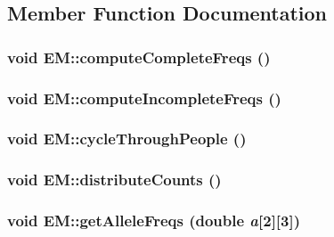 \subsection{Member Function Documentation}
\hypertarget{classEM_a385df83b9c344ceaa000966dccc92796}{
\subsubsection[{computeCompleteFreqs}]{\setlength{\rightskip}{0pt plus 5cm}void EM::computeCompleteFreqs ()}}
\label{classEM_a385df83b9c344ceaa000966dccc92796}
\hypertarget{classEM_af7ab6d102b2901761764b91abb28d88a}{
\subsubsection[{computeIncompleteFreqs}]{\setlength{\rightskip}{0pt plus 5cm}void EM::computeIncompleteFreqs ()}}
\label{classEM_af7ab6d102b2901761764b91abb28d88a}
\hypertarget{classEM_a65fd72ccd0f1a9ff5289e96d419fa65f}{
\subsubsection[{cycleThroughPeople}]{\setlength{\rightskip}{0pt plus 5cm}void EM::cycleThroughPeople ()}}
\label{classEM_a65fd72ccd0f1a9ff5289e96d419fa65f}
\hypertarget{classEM_addc146c4cd9b7d98e01c485454544529}{
\subsubsection[{distributeCounts}]{\setlength{\rightskip}{0pt plus 5cm}void EM::distributeCounts ()}}
\label{classEM_addc146c4cd9b7d98e01c485454544529}
\hypertarget{classEM_ac3787d2909eb87ac231b533482d1f644}{
\subsubsection[{getAlleleFreqs}]{\setlength{\rightskip}{0pt plus 5cm}void EM::getAlleleFreqs (double {\em a}\mbox{[}2\mbox{]}\mbox{[}3\mbox{]})}}
